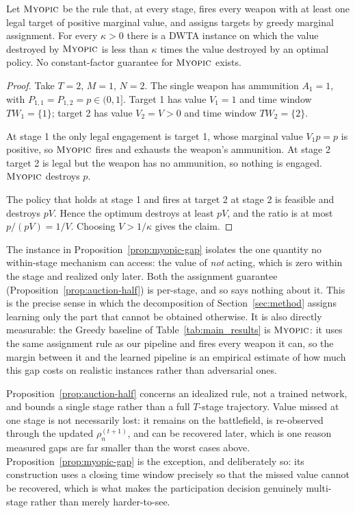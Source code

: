 \begin{proposition}
\label{prop:myopic-gap}
Let $\textsc{Myopic}$ be the rule that, at every stage, fires every weapon
with at least one legal target of positive marginal value, and assigns
targets by greedy marginal assignment. For every $\kappa > 0$ there is a DWTA instance on
which the value destroyed by $\textsc{Myopic}$ is less than $\kappa$ times
the value destroyed by an optimal policy. No constant-factor guarantee for
$\textsc{Myopic}$ exists.
\end{proposition}
\begin{proof}
Take $T=2$, $M=1$, $N=2$. The single weapon has ammunition $A_1 = 1$, with
$P_{1,1}=P_{1,2}=p \in (0,1]$. Target 1
has value $V_1 = 1$ and time window $TW_1 = \{1\}$; target 2 has value
$V_2 = V > 0$ and time window $TW_2 = \{2\}$.

At stage 1 the only legal engagement is target 1, whose marginal value
$V_1 p = p$ is positive, so $\textsc{Myopic}$ fires and exhausts the
weapon's ammunition. At stage 2 target 2 is legal but the weapon has no
ammunition, so nothing is engaged. $\textsc{Myopic}$ destroys $p$.

The policy that holds at stage 1 and fires at target 2 at stage 2 is
feasible and destroys $pV$. Hence the optimum destroys at least $pV$, and
the ratio is at most $p/(pV) = 1/V$. Choosing $V > 1/\kappa$ gives the
claim.
\end{proof}

\begin{remark}
\label{rem:myopic-is-the-job}
The instance in Proposition~\ref{prop:myopic-gap} isolates the one quantity
no within-stage mechanism can access: the value of \emph{not} acting, which
is zero within the stage and realized only later. Both the assignment
guarantee (Proposition~\ref{prop:auction-half}) is per-stage, and so says
nothing about it. This is the precise sense in which the
decomposition of Section~\ref{sec:method} assigns learning only the part
that cannot be obtained otherwise. It is also directly measurable: the
Greedy baseline of Table~\ref{tab:main_results} is $\textsc{Myopic}$: it uses
the same assignment rule as our pipeline and fires every weapon it can, so
the margin between it and the learned pipeline is an empirical estimate of
how much this gap costs on realistic instances rather than adversarial ones.
\end{remark}

\begin{remark}
\label{rem:gap-interpretation}
Proposition~\ref{prop:auction-half} concerns an idealized rule, not a
trained network, and bounds a single stage rather than a full $T$-stage
trajectory. Value missed at one stage is not necessarily
lost: it remains on the battlefield, is re-observed through the updated
$\rho_n^{(t+1)}$, and can be recovered later, which is one reason measured
gaps are far smaller than the worst cases above. Proposition~\ref{prop:myopic-gap}
is the exception, and deliberately so: its construction uses a closing time
window precisely so that the missed value cannot be recovered, which is what
makes the participation decision genuinely multi-stage rather than merely
harder-to-see.
\end{remark}
